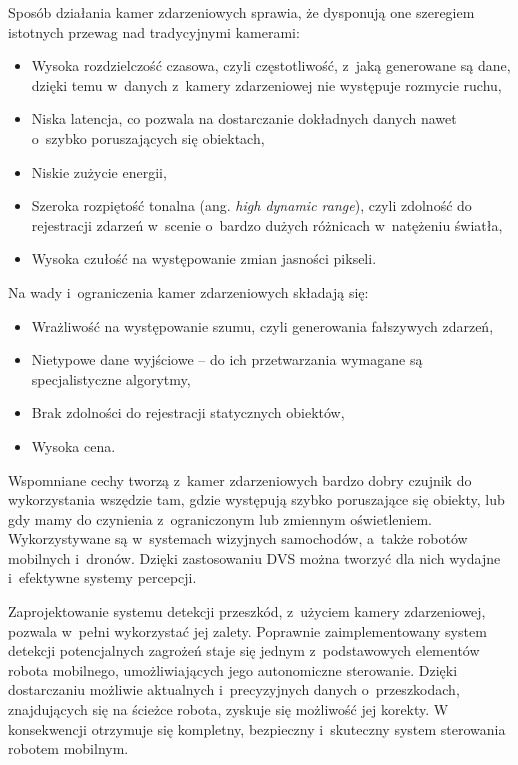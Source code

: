 
Sposób działania kamer zdarzeniowych sprawia, że dysponują one szeregiem istotnych przewag nad tradycyjnymi kamerami:
\begin{itemize}
    \item Wysoka rozdzielczość czasowa, czyli częstotliwość, z~jaką generowane są dane, dzięki temu w~danych z~kamery zdarzeniowej nie występuje rozmycie ruchu,
    \item Niska latencja, co pozwala na dostarczanie dokładnych danych nawet o~szybko poruszających się obiektach,
    \item Niskie zużycie energii,
    \item Szeroka rozpiętość tonalna (ang. \textit{high dynamic range}), czyli zdolność do rejestracji zdarzeń w~scenie o~bardzo dużych różnicach w~natężeniu światła,
    \item Wysoka czułość na występowanie zmian jasności pikseli.
\end{itemize}

\vspace{11px}
Na wady i~ograniczenia kamer zdarzeniowych składają się:
\begin{itemize}
    \item Wrażliwość na występowanie szumu, czyli generowania fałszywych zdarzeń,
    \item Nietypowe dane wyjściowe -- do ich przetwarzania wymagane są specjalistyczne algorytmy,
    \item Brak zdolności do rejestracji statycznych obiektów,
    \item Wysoka cena.
\end{itemize}

Wspomniane cechy tworzą z~kamer zdarzeniowych bardzo dobry czujnik do wykorzystania wszędzie tam, gdzie występują szybko poruszające się obiekty, lub gdy mamy do czynienia z~ograniczonym lub zmiennym oświetleniem.
Wykorzystywane są w~systemach wizyjnych samochodów, a~także robotów mobilnych i~dronów. Dzięki zastosowaniu DVS można tworzyć dla nich wydajne i~efektywne systemy percepcji.


Zaprojektowanie systemu detekcji przeszkód, z~użyciem kamery zdarzeniowej, pozwala w~pełni wykorzystać jej zalety. Poprawnie zaimplementowany system detekcji potencjalnych zagrożeń staje się jednym z~podstawowych elementów robota mobilnego, umożliwiających jego autonomiczne sterowanie. Dzięki dostarczaniu możliwie aktualnych i~precyzyjnych danych o~przeszkodach, znajdujących się na ścieżce robota, zyskuje się możliwość jej korekty. W konsekwencji otrzymuje się kompletny, bezpieczny i~skuteczny system sterowania robotem mobilnym.

